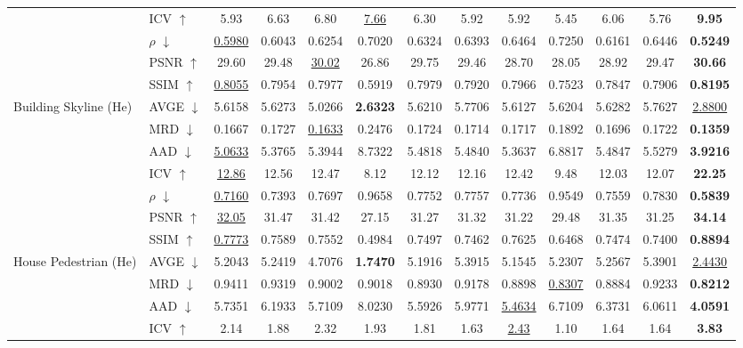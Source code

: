 \begin{table}[t]
{\begin{tabular}{llccccccccccc}
 & ICV $\uparrow$ & 5.93 & 6.63 & 6.80 & \underline{7.66} & 6.30 & 5.92 & 5.92 & 5.45 & 6.06 & 5.76 & \textbf{9.95} \\
 & $\rho$ $\downarrow$ & \underline{0.5980} & 0.6043 & 0.6254 & 0.7020 & 0.6324 & 0.6393 & 0.6464 & 0.7250 & 0.6161 & 0.6446 & \textbf{0.5249} \\
 & PSNR $\uparrow$ & 29.60 & 29.48 & \underline{30.02} & 26.86 & 29.75 & 29.46 & 28.70 & 28.05 & 28.92 & 29.47 & \textbf{30.66} \\
 & SSIM $\uparrow$ & \underline{0.8055} & 0.7954 & 0.7977 & 0.5919 & 0.7979 & 0.7920 & 0.7966 & 0.7523 & 0.7847 & 0.7906 & \textbf{0.8195} \\
\midrule
\multirow{7}{*}{Building Skyline (He)} & AVGE $\downarrow$ & 5.6158 & 5.6273 & 5.0266 & \textbf{2.6323} & 5.6210 & 5.7706 & 5.6127 & 5.6204 & 5.6282 & 5.7627 & \underline{2.8800} \\
 & MRD $\downarrow$ & 0.1667 & 0.1727 & \underline{0.1633} & 0.2476 & 0.1724 & 0.1714 & 0.1717 & 0.1892 & 0.1696 & 0.1722 & \textbf{0.1359} \\
 & AAD $\downarrow$ & \underline{5.0633} & 5.3765 & 5.3944 & 8.7322 & 5.4818 & 5.4840 & 5.3637 & 6.8817 & 5.4847 & 5.5279 & \textbf{3.9216} \\
 & ICV $\uparrow$ & \underline{12.86} & 12.56 & 12.47 & 8.12 & 12.12 & 12.16 & 12.42 & 9.48 & 12.03 & 12.07 & \textbf{22.25} \\
 & $\rho$ $\downarrow$ & \underline{0.7160} & 0.7393 & 0.7697 & 0.9658 & 0.7752 & 0.7757 & 0.7736 & 0.9549 & 0.7559 & 0.7830 & \textbf{0.5839} \\
 & PSNR $\uparrow$ & \underline{32.05} & 31.47 & 31.42 & 27.15 & 31.27 & 31.32 & 31.22 & 29.48 & 31.35 & 31.25 & \textbf{34.14} \\
 & SSIM $\uparrow$ & \underline{0.7773} & 0.7589 & 0.7552 & 0.4984 & 0.7497 & 0.7462 & 0.7625 & 0.6468 & 0.7474 & 0.7400 & \textbf{0.8894} \\
\midrule
\multirow{7}{*}{House Pedestrian (He)} & AVGE $\downarrow$ & 5.2043 & 5.2419 & 4.7076 & \textbf{1.7470} & 5.1916 & 5.3915 & 5.1545 & 5.2307 & 5.2567 & 5.3901 & \underline{2.4430} \\
 & MRD $\downarrow$ & 0.9411 & 0.9319 & 0.9002 & 0.9018 & 0.8930 & 0.9178 & 0.8898 & \underline{0.8307} & 0.8884 & 0.9233 & \textbf{0.8212} \\
 & AAD $\downarrow$ & 5.7351 & 6.1933 & 5.7109 & 8.0230 & 5.5926 & 5.9771 & \underline{5.4634} & 6.7109 & 6.3731 & 6.0611 & \textbf{4.0591} \\
 & ICV $\uparrow$ & 2.14 & 1.88 & 2.32 & 1.93 & 1.81 & 1.63 & \underline{2.43} & 1.10 & 1.64 & 1.64 & \textbf{3.83} \\

\end{tabular}}
\end{table}

